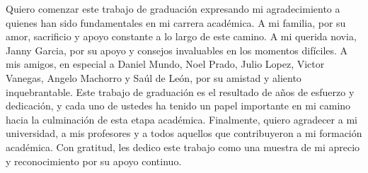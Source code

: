 Quiero comenzar este trabajo de graduación expresando mi agradecimiento a
quienes han sido fundamentales en mi carrera académica. A mi familia, por su
amor, sacrificio y apoyo constante a lo largo de este camino. A mi querida
novia, Janny Garcia, por su apoyo y consejos invaluables en los momentos
difíciles. A mis amigos, en especial a Daniel Mundo, Noel Prado, Julio
Lopez, Victor Vanegas, Angelo Machorro y Saúl de León, por su amistad y aliento
inquebrantable. Este trabajo de graduación es el resultado de años de esfuerzo 
y dedicación, y cada uno de ustedes ha tenido un papel importante en mi camino 
hacia la culminación de esta etapa académica. Finalmente, quiero agradecer a mi
universidad, a mis profesores y a todos aquellos que contribuyeron a mi 
formación académica. Con gratitud, les dedico este trabajo como una muestra
 de mi aprecio y reconocimiento por su apoyo continuo.

 